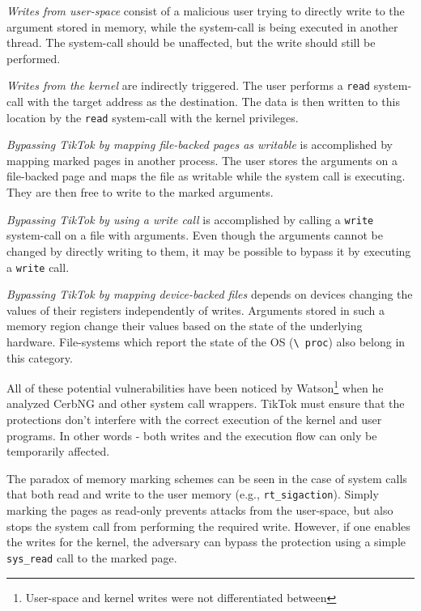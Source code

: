 \emph{Writes from user-space} consist of a malicious user trying to directly
write to the argument stored in memory, while the system-call is being executed
in another thread. The system-call should be unaffected, but the write should
still be performed.

\emph{Writes from the kernel} are indirectly triggered. The user performs a \texttt{read}
system-call with the target address as the destination. The data is then written
to this location by the \texttt{read} system-call with the kernel privileges.

\emph{Bypassing TikTok by mapping file-backed pages as writable} is accomplished
by mapping marked pages in another process. The user stores the arguments on a
file-backed page and maps the file as writable while the system call is executing.
They are then free to write to the marked arguments.

\emph{Bypassing TikTok by using a write call} is accomplished by calling a
\texttt{write} system-call on a file with arguments. Even though the arguments
cannot be changed by directly writing to them, it may be possible to bypass it
by executing a \texttt{write} call.

\emph{Bypassing TikTok by mapping device-backed files} depends on devices
changing the values of their registers independently of writes. Arguments stored
in such a memory region change their values based on the state of the underlying
hardware. File-systems which report the state of the OS (\texttt{\textbackslash
proc}) also belong in this category.

All of these potential vulnerabilities have been noticed by
Watson\footnote{User-space and kernel writes were not differentiated between}
when he analyzed CerbNG\cite{watson2007exploiting} and other system call
wrappers. TikTok must ensure that the protections don't interfere with the
correct execution of the kernel and user programs. In other words - both writes
and the execution flow can only be temporarily affected.

The paradox of memory marking schemes can be seen in the case of system calls
that both read and write to the user memory (e.g., \texttt{rt\_sigaction}).
Simply marking the pages as read-only prevents attacks from the user-space, but
also stops the system call from performing the required write. However, if one
enables the writes for the kernel, the adversary can bypass the protection
using a simple \texttt{sys\_read} call to the marked page.

